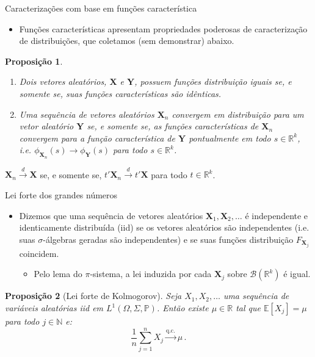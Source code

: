 \documentclass[11pt]{beamer}
\newtheorem{proposition}{Proposição}
\begin{document}
	\begin{frame}{Caracterizações com base em funções característica}
		\begin{itemize}
			\item Funções características apresentam propriedades poderosas de caracterização de distribuições, que coletamos (sem demonstrar) abaixo.
		\end{itemize}
		\begin{proposition}
		\begin{enumerate}
			\item Dois vetores aleatórios, $\boldsymbol{X}$ e $\boldsymbol{Y}$, possuem funções distribuição iguais se, e somente se, suas funções características são idênticas.
			\item Uma sequência de vetores aleatórios $\boldsymbol{X}_n$ convergem em distribuição para um vetor aleatório $\boldsymbol{Y}$ se, e somente se, as funções características de $\boldsymbol{X}_n$ convergem para a função característica de $\boldsymbol{Y}$ pontualmente em todo $s \in \mathbb{R}^k$, i.e. $\phi_{\boldsymbol{X}_n}(s) \to \phi_{\boldsymbol{Y}}(s)$ para todo $s \in \mathbb{R}^k$. 
		\end{enumerate}
		\end{proposition}
		\begin{corollary}
			$\boldsymbol{X}_n \overset{d}{\to} \boldsymbol{X}$ se, e somente se, $t'\boldsymbol{X}_n  \overset{d}{\to} t'\boldsymbol{X}$ para todo $t \in \mathbb{R}^k$.
		\end{corollary}
	\end{frame}
	
	\begin{frame}{Lei forte dos grandes números}
		\begin{itemize}
			\item Dizemos que uma sequência de vetores aleatórios $\boldsymbol{X}_1, \boldsymbol{X}_2, \ldots$ é independente e identicamente distribuída (iid) se os vetores aleatórios são independentes (i.e. suas $\sigma$-álgebras geradas são independentes) e se suas funções distribuição $F_{\boldsymbol{X}_j}$ coincidem.
			\begin{itemize}
				\item Pelo lema do $\pi$-sistema, a lei induzida por cada $\boldsymbol{X}_j$ sobre $\mathcal{B}(\mathbb{R}^k)$ é igual.
			\end{itemize}
		\end{itemize}
	\begin{proposition}[Lei forte de Kolmogorov]
			Seja $X_1, X_2,\ldots$ uma sequência de variáveis aleatórias iid em $L^1(\Omega,\Sigma,\mathbb{P})$.
			Então existe $\mu \in \mathbb{R}$ tal que $\mathbb{E}[X_j] = \mu$ para todo $j\in \mathbb{N}$ e:
$$\frac{1}{n}\sum_{j=1}^n X_j \overset{\text{q.c.}}{\to} \mu\, .$$
	\end{proposition}

	\end{frame}
	
\end{document}
